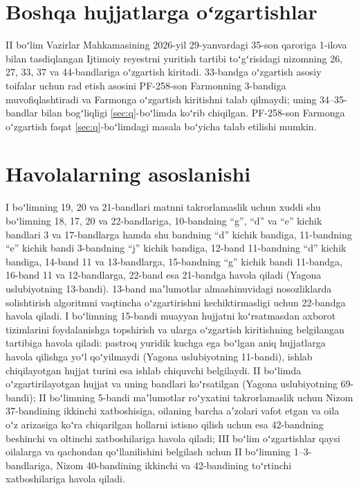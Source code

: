 \documentclass[14pt,a4paper]{extarticle}
\begin{document}
\section{Boshqa hujjatlarga oʻzgartishlar}
II boʻlim Vazirlar Mahkamasining 2026-yil 29-yanvardagi 35-son qaroriga 1-ilova bilan tasdiqlangan Ijtimoiy reyestrni yuritish tartibi toʻgʻrisidagi nizomning 26, 27, 33, 37 va 44-bandlariga oʻzgartish kiritadi. 33-bandga oʻzgartish asosiy toifalar uchun rad etish asosini PF-258-son Farmonning 3-bandiga muvofiqlashtiradi va Farmonga oʻzgartish kiritishni talab qilmaydi; uning 34–35-bandlar bilan bogʻliqligi \ref{sec:q}-boʻlimda koʻrib chiqilgan. PF-258-son Farmonga oʻzgartish faqat \ref{sec:q}-boʻlimdagi masala boʻyicha talab etilishi mumkin.

\section{Havolalarning asoslanishi}
I boʻlimning 19, 20 va 21-bandlari matnni takrorlamaslik uchun xuddi shu boʻlimning 18, 17, 20 va 22-bandlariga, 10-bandning “g”, “d” va “e” kichik bandlari 3 va 17-bandlarga hamda shu bandning “d” kichik bandiga, 11-bandning “e” kichik bandi 3-bandning “j” kichik bandiga, 12-band 11-bandning “d” kichik bandiga, 14-band 11 va 13-bandlarga, 15-bandning “g” kichik bandi 11-bandga, 16-band 11 va 12-bandlarga, 22-band esa 21-bandga havola qiladi (Yagona uslubiyotning 13-bandi). 13-band maʼlumotlar almashinuvidagi nosozliklarda solishtirish algoritmni vaqtincha oʻzgartirishni kechiktirmasligi uchun 22-bandga havola qiladi. I boʻlimning 15-bandi muayyan hujjatni koʻrsatmasdan axborot tizimlarini foydalanishga topshirish va ularga oʻzgartish kiritishning belgilangan tartibiga havola qiladi: pastroq yuridik kuchga ega boʻlgan aniq hujjatlarga havola qilishga yoʻl qoʻyilmaydi (Yagona uslubiyotning 11-bandi), ishlab chiqilayotgan hujjat turini esa ishlab chiquvchi belgilaydi. II boʻlimda oʻzgartirilayotgan hujjat va uning bandlari koʻrsatilgan (Yagona uslubiyotning 69-bandi); II boʻlimning 5-bandi maʼlumotlar roʻyxatini takrorlamaslik uchun Nizom 37-bandining ikkinchi xatboshisiga, oilaning barcha aʼzolari vafot etgan va oila oʻz arizasiga koʻra chiqarilgan hollarni istisno qilish uchun esa 42-bandning beshinchi va oltinchi xatboshilariga havola qiladi; III boʻlim oʻzgartishlar qaysi oilalarga va qachondan qoʻllanilishini belgilash uchun II boʻlimning 1–3-bandlariga, Nizom 40-bandining ikkinchi va 42-bandining toʻrtinchi xatboshilariga havola qiladi.
\end{document}
